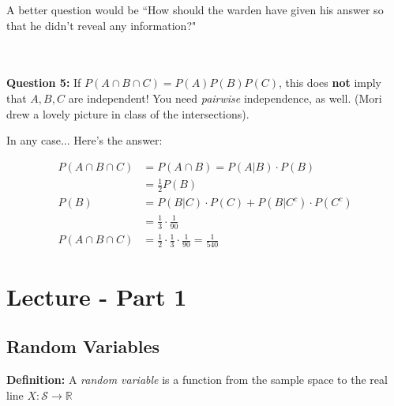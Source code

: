 \documentclass{article}
\begin{document}
A better question would be ``How should the warden have given his answer so that he didn't reveal any information?"

\\~\\

\noindent \textbf{Question 5:} If $P(A \cap B \cap C) = P(A)P(B)P(C)$, this does \textbf{not} imply that $A,B,C$ are independent! You need \textit{pairwise} independence, as well. (Mori drew a lovely picture in class of the intersections).

In any case... Here's the answer:

\begin{equation*}
\begin{split}
    P(A\cap B \cap C) &= P(A \cap B) = P(A|B) \cdot P(B)\\
                        &= \frac{1}{2} P(B)\\
                    P(B) &= P(B|C) \cdot P(C) + P(B|C^c) \cdot P(C^c) \\
                        &= \frac{1}{3}\cdot \frac{1}{90}\\
                    P(A\cap B \cap C) &= \frac{1}{2} \cdot \frac{1}{3}\cdot \frac{1}{90} = \frac{1}{540}
\end{split}
\end{equation*}


\section{Lecture - Part 1}
\subsection{Random Variables}

\textbf{Definition:} A \textit{random variable} is a function from the sample space to the real line $X: \mathcal{S} \to \mathbb{R}$\\~\\
\end{document}
